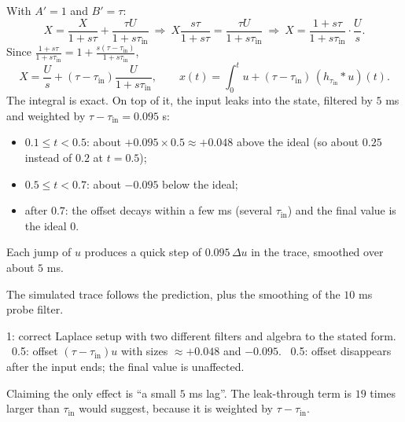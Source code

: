 \documentclass[11pt,letterpaper]{article}
\newcommand{\tin}{\tau_{\mathrm{in}}}
\newcommand{\ans}[1]{\par\vspace{4pt}{\bfseries #1}\quad}
\begin{document}
\ans{(b) [2]}
With $A' = 1$ and $B' = \tau$:
\[
X = \frac{X}{1 + s\tau} + \frac{\tau U}{1 + s\tin}
\ \Rightarrow\ X\frac{s\tau}{1 + s\tau} = \frac{\tau U}{1 + s\tin}
\ \Rightarrow\ X = \frac{1 + s\tau}{1 + s\tin}\cdot\frac{U}{s}.
\]
Since $\frac{1 + s\tau}{1 + s\tin} = 1 + \frac{s(\tau - \tin)}{1 + s\tin}$,
\[
X = \frac{U}{s} + (\tau - \tin)\frac{U}{1 + s\tin}, \qquad x(t) = \int_0^t u + (\tau - \tin)\,(h_{\tin} * u)(t).
\]
The integral is exact. On top of it, the input leaks into the state, filtered by $5$ ms and weighted by $\tau - \tin = 0.095$ s:
\begin{itemize}[leftmargin=1.2em]
\item $0.1 \le t < 0.5$: about $+0.095 \times 0.5 \approx +0.048$ above the ideal (so about $0.25$ instead of $0.2$ at $t = 0.5$);
\item $0.5 \le t < 0.7$: about $-0.095$ below the ideal;
\item after $0.7$: the offset decays within a few ms (several $\tin$) and the final value is the ideal $0$.
\end{itemize}
Each jump of $u$ produces a quick step of $0.095\,\Delta u$ in the trace, smoothed over about $5$ ms.
\begin{center}
\end{center}
The simulated trace follows the prediction, plus the smoothing of the $10$ ms probe filter.
\begin{marking}
1: correct Laplace setup with two different filters and algebra to the stated form. \ 0.5: offset $(\tau - \tin)u$ with sizes $\approx +0.048$ and $-0.095$. \ 0.5: offset disappears after the input ends; the final value is unaffected.
\end{marking}
\begin{trap}
Claiming the only effect is ``a small $5$ ms lag''. The leak-through term is $19$ times larger than $\tin$ would suggest, because it is weighted by $\tau - \tin$.
\end{trap}
\end{document}
